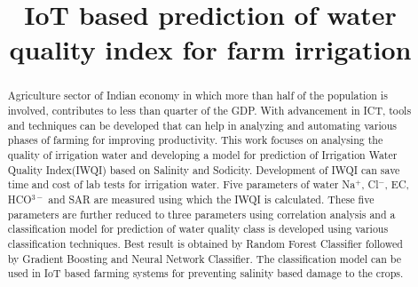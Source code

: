 \documentclass[conference]{IEEEtran}
\begin{document}
\title{IoT based prediction of water quality index for farm irrigation}

\author{
\and
{}
\and
{}

}

\maketitle

\begin{abstract}
Agriculture sector of Indian economy in which more than half of the population is involved, contributes to less than quarter of the GDP. With advancement in ICT, tools and techniques can be developed that can help in analyzing and automating various phases of farming for improving productivity. This work focuses on analysing the quality of irrigation water and developing a model for prediction of Irrigation Water Quality Index(IWQI) based on Salinity and Sodicity.
Development of IWQI can save time and cost of lab tests for irrigation water. Five parameters of water Na$^+$, Cl$^-$, EC, HCO$^{3-}$ and SAR are measured using which the IWQI is calculated. These five parameters are further reduced to three parameters using correlation analysis and a classification model for prediction of water quality class is developed using various classification techniques. Best result is obtained by Random Forest Classifier followed by Gradient Boosting and Neural Network Classifier. The classification model can be used in IoT based farming systems for preventing salinity based damage to the crops.

\end{abstract}
\end{document}
